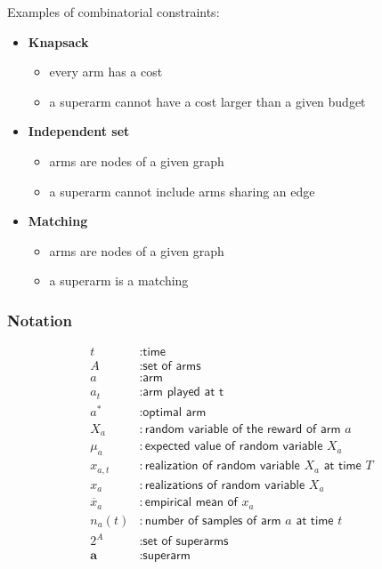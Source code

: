 \documentclass[10pt,a4paper]{article}
\begin{document}
Examples of combinatorial constraints:

\begin{itemize}
\item \textbf{Knapsack}
\begin{itemize}
\item every arm has a cost
\item a superarm cannot have a cost larger than a given budget
\end{itemize}
\item \textbf{Independent set}
\begin{itemize}
\item arms are nodes of a given graph
\item a superarm cannot include arms sharing an edge
\end{itemize}
\item \textbf{Matching}
\begin{itemize}
\item arms are nodes of a given graph
\item a superarm is a matching
\end{itemize}
\end{itemize}

\subsubsection{Notation}\label{notation}

$$\begin{aligned} t &: \textsf{time} \\ A&: \textsf{set of arms} \\ a&: \textsf{arm} \\ a_t &: \textsf{arm played at t} \\ a^* &: \textsf{optimal arm} \\ X_a &: \textsf{random variable of the reward of arm } a \\ \mu_a &: \textsf{expected value of random variable } X_a \\ x_{a,t} &: \textsf{realization of random variable } X_a \textsf{ at time } T \\ x_a &: \textsf{realizations of random variable } X_a \\ \overline{x}_a &: \textsf{empirical mean of } x_a \\ n_a(t) &: \textsf{number of samples of arm } a \textsf{ at time } t \\ 2^A &: \textsf{set of superarms} \\ \mathbf{a} &: \textsf{superarm} \end{aligned}$$
\end{document}
